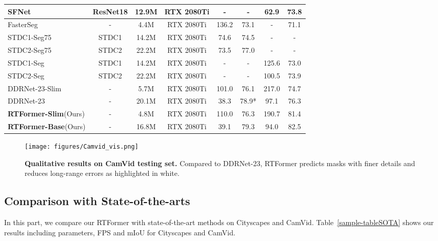 \documentclass{article}
\begin{document}
\begin{table}
{\begin{tabular}{l|c|c|c|cc|cc}
\midrule
    SFNet   \cite{li2020semantic}
&ResNet18  &12.9M &RTX 2080Ti &- &-  &62.9 &73.8\\
    \midrule
    FasterSeg \cite{chen2019fasterseg} &- &4.4M &RTX 2080Ti &136.2 &73.1 &- &71.1\\
    \midrule
    STDC1-Seg75\cite{fan2021rethinking} &STDC1 &14.2M &RTX 2080Ti &74.6 &74.5 &- &-\\
    STDC2-Seg75\cite{fan2021rethinking} &STDC2 &22.2M &RTX 2080Ti &73.5 &77.0 &- &-\\
    STDC1-Seg\cite{fan2021rethinking} &STDC1 &14.2M &RTX 2080Ti &- &- &125.6 &73.0\\
    STDC2-Seg\cite{fan2021rethinking} &STDC2 &22.2M &RTX 2080Ti &- &- &100.5 &73.9\\
    \midrule
    DDRNet-23-Slim \cite{hong2021deep} &- &5.7M &RTX 2080Ti &101.0 &76.1 &217.0 &74.7\\
    DDRNet-23 \cite{hong2021deep} &- &20.1M &RTX 2080Ti &38.3 &78.9* &97.1 &76.3\\
    \midrule
    \textbf{RTFormer-Slim}(Ours) &- &4.8M &RTX 2080Ti &110.0 &76.3 &190.7 &81.4\\
    \textbf{RTFormer-Base}(Ours) &- &16.8M &RTX 2080Ti &39.1 &79.3 &94.0 &82.5\\
\bottomrule
  \end{tabular}
}
\end{table}


\begin{figure}
    \centering
    \texttt{[image: figures/Camvid\_vis.png]}
    \caption{\textbf{Qualitative results on CamVid\cite{CamVid} testing set.} Compared to DDRNet-23\cite{fu2019dual}, RTFormer predicts masks with finer details and reduces long-range errors as highlighted in white.}
    \label{fig:vis_camvid}
\end{figure}


\subsection{Comparison with State-of-the-arts}
In this part, we compare our RTFormer with state-of-the-art methods on Cityscapes\cite{Cityscapes} and CamVid\cite{CamVid}. Table~\ref{sample-tableSOTA} shows our results including parameters, FPS and mIoU for Cityscapes\cite{Cityscapes} and CamVid\cite{CamVid}.

\vspace{-2mm}
\end{document}
